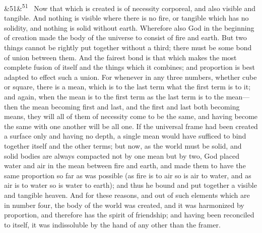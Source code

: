 \documentclass[12pt]{article}
\newcommand{\para}[1][]{\par\noindent\ifx&#1&\else\textsuperscript{\footnotesize #1}~\fi}
\begin{document}
\para[51] Now that which is created is of necessity corporeal, and also visible and tangible. And nothing is visible where there is no fire, or tangible which has no solidity, and nothing is solid without earth. Wherefore also God in the beginning of creation made the body of the universe to consist of fire and earth. But two things cannot be rightly put together without a third; there must be some bond of union between them. And the fairest bond is that which makes the most complete fusion of itself and the things which it combines; and proportion is best adapted to effect such a union. For whenever in any three numbers, whether cube or square, there is a mean, which is to the last term what the first term is to it; and again, when the mean is to the first term as the last term is to the mean---then the mean becoming first and last, and the first and last both becoming means, they will all of them of necessity come to be the same, and having become the same with one another will be all one. If the universal frame had been created a surface only and having no depth, a single mean would have sufficed to bind together itself and the other terms; but now, as the world must be solid, and solid bodies are always compacted not by one mean but by two, God placed water and air in the mean between fire and earth, and made them to have the same proportion so far as was possible (as fire is to air so is air to water, and as air is to water so is water to earth); and thus he bound and put together a visible and tangible heaven. And for these reasons, and out of such elements which are in number four, the body of the world was created, and it was harmonized by proportion, and therefore has the spirit of friendship; and having been reconciled to itself, it was indissoluble by the hand of any other than the framer.
\end{document}
